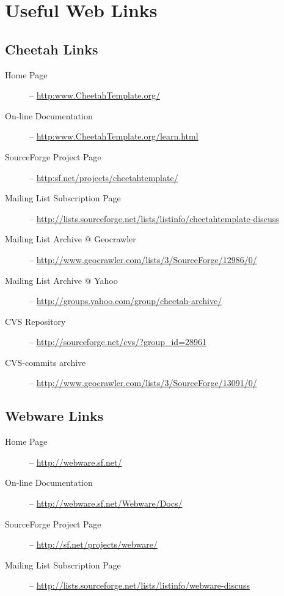 \section{Useful Web Links}
\label{links}


\subsection{Cheetah Links}
\label{links.cheetah}

\begin{description}
\item[Home Page] -- \url{http:www.CheetahTemplate.org/}
     
\item[On-line Documentation] -- \url{http:www.CheetahTemplate.org/learn.html}
     
\item[SourceForge Project Page] -- \url{http:sf.net/projects/cheetahtemplate/}
     
\item[Mailing List Subscription Page] --
     \url{http://lists.sourceforge.net/lists/listinfo/cheetahtemplate-discuss}
     
\item[Mailing List Archive @ Geocrawler] --
     \url{http://www.geocrawler.com/lists/3/SourceForge/12986/0/}

\item[Mailing List Archive @ Yahoo] --
     \url{http://groups.yahoo.com/group/cheetah-archive/}
    
\item[CVS Repository] -- \url{http://sourceforge.net/cvs/?group_id=28961}
     
\item[CVS-commits archive] --
     \url{http://www.geocrawler.com/lists/3/SourceForge/13091/0/}

\end{description}

\subsection{Webware Links}
\label{links.webware}

\begin{description}
\item[Home Page] -- \url{http://webware.sf.net/}
     
\item[On-line Documentation] -- \url{http://webware.sf.net/Webware/Docs/}
     
\item[SourceForge Project Page] -- \url{http://sf.net/projects/webware/}
     
\item[Mailing List Subscription Page] --
     \url{http://lists.sourceforge.net/lists/listinfo/webware-discuss}

\end{description}


